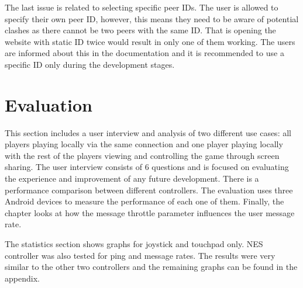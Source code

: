 \documentclass{l4proj}
\begin{document}
The last issue is related to selecting specific peer IDs. The user is allowed to specify their own peer ID, however, this means they need to be aware of potential clashes as there cannot be two peers with the same ID. That is opening the website with static ID twice would result in only one of them working. The users are informed about this in the documentation and it is recommended to use a specific ID only during the development stages.




\chapter{Evaluation} 
This section includes a user interview and analysis of two different use cases: all players playing locally via the same connection and one player playing locally with the rest of the players viewing and controlling the game through screen sharing. The user interview consists of 6 questions and is focused on evaluating the experience and improvement of any future development. There is a performance comparison between different controllers. The evaluation uses three Android devices to measure the performance of each one of them. Finally, the chapter looks at how the message throttle parameter influences the user message rate. \par 
The statistics section shows graphs for joystick and touchpad only. NES controller was also tested for ping and message rates. The results were very similar to the other two controllers and the remaining graphs can be found in the appendix.
\end{document}
